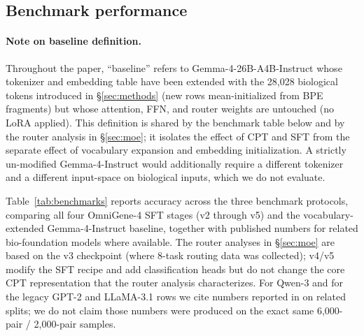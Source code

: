 \documentclass[11pt]{article}
\begin{document}
\subsection{Benchmark performance}
\label{sec:benchmarks}

\paragraph{Note on baseline definition.} Throughout the paper, ``baseline'' refers to Gemma-4-26B-A4B-Instruct whose tokenizer and embedding table have been extended with the 28{,}028 biological tokens introduced in \S\ref{sec:methods} (new rows mean-initialized from BPE fragments) but whose attention, FFN, and router weights are untouched (no LoRA applied). This definition is shared by the benchmark table below and by the router analysis in \S\ref{sec:moe}; it isolates the effect of CPT and SFT from the separate effect of vocabulary expansion and embedding initialization. A strictly un-modified Gemma-4-Instruct would additionally require a different tokenizer and a different input-space on biological inputs, which we do not evaluate.

Table~\ref{tab:benchmarks} reports accuracy across the three benchmark protocols, comparing all four OmniGene-4 SFT stages (v2 through v5) and the vocabulary-extended Gemma-4-Instruct baseline, together with published numbers for related bio-foundation models where available. The router analyses in \S\ref{sec:moe} are based on the v3 checkpoint (where 8-task routing data was collected); v4/v5 modify the SFT recipe and add classification heads but do not change the core CPT representation that the router analysis characterizes. For Qwen-3 and for the legacy GPT-2 and LLaMA-3.1 rows we cite numbers reported in \citep{wang2026biopaws} on related splits; we do not claim those numbers were produced on the exact same 6{,}000-pair / 2{,}000-pair samples.
\end{document}
